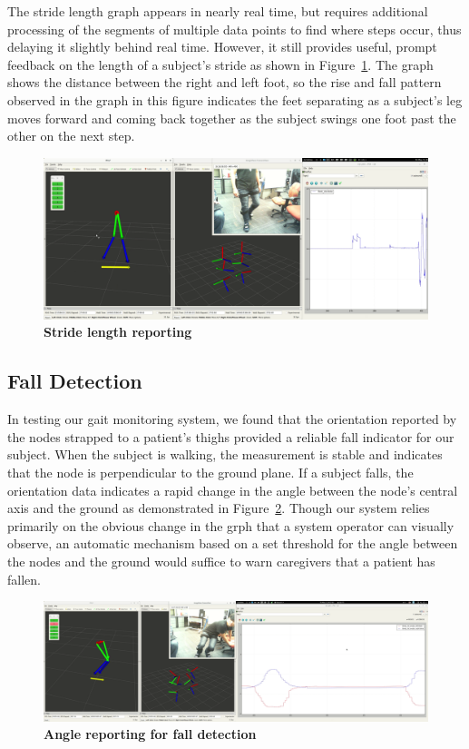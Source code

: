 \documentclass[conference]{IEEEtran}
\begin{document}
The stride length graph appears in nearly real time, but requires additional processing
of the segments of multiple data points to find where steps occur, thus delaying it
slightly behind real time. However, it still provides useful, prompt feedback on the
length of a subject's stride as shown in Figure~\ref{fig:length}. The graph shows the
distance between the right and left foot, so the rise and fall pattern observed in the
graph in this figure indicates the feet separating as a subject's leg moves forward and coming
back together as the subject swings one foot past the other on the next step. 

\begin{figure}[h]
  \centering
  \includegraphics[width=0.95\columnwidth]{figs/length}
  \caption{{\bf Stride length reporting}}
  \label{fig:length}
\end{figure}

\subsection{Fall Detection}
In testing our gait monitoring system, we found that the orientation reported by the nodes
strapped to a patient's thighs provided a reliable fall indicator for our subject. When
the subject is walking, the measurement is stable and indicates that the node is
perpendicular to the ground plane. If a subject falls, the orientation data indicates a
rapid change in the angle between the node's central axis and the ground as demonstrated
in Figure~\ref{fig:falling}. Though our system relies primarily on the obvious change in
the grph that a system operator can visually observe, an automatic mechanism based on a
set threshold for the angle between the nodes and the ground would suffice to warn
caregivers that a patient has fallen. 

\begin{figure}[h]
  \centering
  \includegraphics[width=.99\columnwidth]{figs/falling}
  \caption{{\bf Angle reporting for fall detection }}
  \label{fig:falling}
\end{figure}
\end{document}
